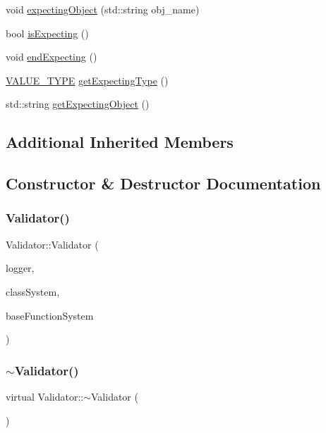 \begin{DoxyCompactItemize}
void \hyperlink{classValidator_a6a88dbc8624b8803408094c16a98c205}{expecting\+Object} (std\+::string obj\+\_\+name)
\item 
bool \hyperlink{classValidator_ab94d9925c577be6a8cad24a5a6b60db9}{is\+Expecting} ()
\item 
void \hyperlink{classValidator_adfa1b750001981ae5daa085d32bd626f}{end\+Expecting} ()
\item 
\hyperlink{statics_8h_a0674a913b8e8c8a9f265baab3646b565}{V\+A\+L\+U\+E\+\_\+\+T\+Y\+PE} \hyperlink{classValidator_a786b6b8a5dc6136bbcb2d012e1d8914b}{get\+Expecting\+Type} ()
\item 
std\+::string \hyperlink{classValidator_aca02c85892f3c74114fa936bad41ff07}{get\+Expecting\+Object} ()
\end{DoxyCompactItemize}
\subsection*{Additional Inherited Members}


\subsection{Constructor \& Destructor Documentation}
\mbox{\label{classValidator_ae4550667c2bc1d85f4654cf6f5efe253}} 
\subsubsection{\texorpdfstring{Validator()}{Validator()}}
{\footnotesize\ttfamily Validator\+::\+Validator (\begin{DoxyParamCaption}\item[{\hyperlink{classLogger}{Logger} $\ast$}]{logger,  }\item[{\hyperlink{classClassSystem}{Class\+System} $\ast$}]{class\+System,  }\item[{\hyperlink{classFunctionSystem}{Function\+System} $\ast$}]{base\+Function\+System }\end{DoxyParamCaption})}

\mbox{\label{classValidator_a4270e7ebf0c451ff80b4ec6fd8eb6a42}} 
\subsubsection{\texorpdfstring{$\sim$\+Validator()}{~Validator()}}
{\footnotesize\ttfamily virtual Validator\+::$\sim$\+Validator (\begin{DoxyParamCaption}{ }\end{DoxyParamCaption})\hspace{0.3cm}{\ttfamily [virtual]}}



